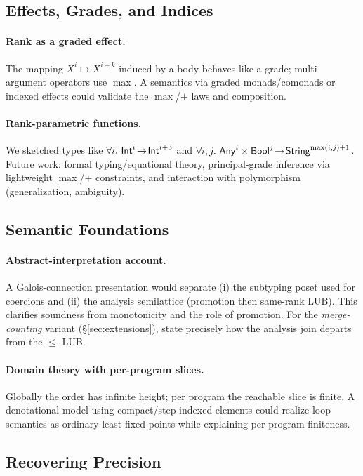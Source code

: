 \subsection{Effects, Grades, and Indices}
\paragraph{Rank as a graded effect.}
The mapping $X^{i}\mapsto X^{i+k}$ induced by a body behaves like a grade; multi-argument operators use $\max$. A semantics via graded monads/comonads or indexed effects could validate the $\max$/$+$ laws and composition.

\paragraph{Rank-parametric functions.}
We sketched types like $\forall i.\ \Int^i\!\to\!\Int^{i+3}$ and $\forall i,j.\ \mathsf{Any}^i\times\mathsf{Bool}^j\!\to\!\mathsf{String}^{\max(i,j)+1}$. Future work: formal typing/equational theory, principal-grade inference via lightweight $\max$/$+$ constraints, and interaction with polymorphism (generalization, ambiguity).

\subsection{Semantic Foundations}
\paragraph{Abstract-interpretation account.}
A Galois-connection presentation would separate (i) the subtyping poset used for coercions and (ii) the analysis semilattice (promotion then same-rank LUB). This clarifies soundness from monotonicity and the role of promotion. For the \emph{merge-counting} variant (\S\ref{sec:extensions}), state precisely how the analysis join departs from the $\le$-LUB.

\paragraph{Domain theory with per-program slices.}
Globally the order has infinite height; per program the reachable slice is finite. A denotational model using compact/step-indexed elements could realize loop semantics as ordinary least fixed points while explaining per-program finiteness.

\subsection{Recovering Precision}
